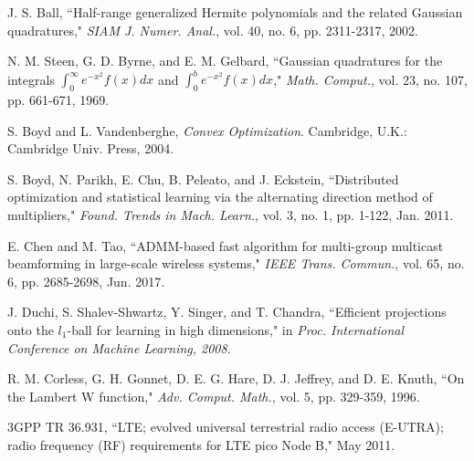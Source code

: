 \documentclass[journal]{IEEEtran}
\begin{document}
\begin{thebibliography}{1}
 J. S. Ball, ``Half-range generalized Hermite polynomials and the related Gaussian quadratures," \emph{SIAM J. Numer. Anal.}, vol. 40, no. 6, pp. 2311-2317, 2002.

 N. M. Steen, G. D. Byrne, and E. M. Gelbard, ``Gaussian quadratures for the integrals $\int_{0}^{\infty} e^{-x^2}f\left(x\right) dx$ and $\int_{0}^{b}e^{-x^2}f\left(x\right)dx$," \emph{Math. Comput.}, vol. 23, no. 107, pp. 661-671, 1969.

 S. Boyd and L. Vandenberghe, \emph{Convex Optimization}. Cambridge, U.K.: Cambridge Univ. Press, 2004.

 S. Boyd, N. Parikh, E. Chu, B. Peleato, and J. Eckstein, ``Distributed optimization and statistical learning via the alternating direction method of multipliers," \emph{Found. Trends in Mach. Learn.}, vol. 3, no. 1, pp. 1-122, Jan. 2011.

 E. Chen and M. Tao, ``ADMM-based fast algorithm for multi-group multicast beamforming in large-scale wireless systems," \emph{IEEE Trans. Commun.}, vol. 65, no. 6, pp. 2685-2698, Jun. 2017.

 J. Duchi, S. Shalev-Shwartz, Y. Singer, and T. Chandra, ``Efficient projections onto the $l_1$-ball for learning in high dimensions," in \emph{Proc. International Conference on Machine Learning, 2008}.

 R. M. Corless, G. H. Gonnet, D. E. G. Hare, D. J. Jeffrey, and D. E. Knuth, ``On the Lambert W function," \emph{Adv. Comput. Math.}, vol. 5, pp. 329-359, 1996.

 3GPP TR 36.931, ``LTE; evolved universal terrestrial radio access (E-UTRA); radio frequency (RF) requirements for LTE pico Node B,"
    May 2011.

\end{thebibliography}
\end{document}
